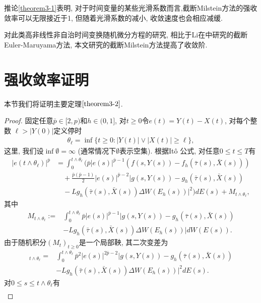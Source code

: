 \begin{remark}
    推论\ref{theorem3-1}表明, 对于时间变量的某些光滑系数而言,截断Milstein方法的强收敛率可以无限接近于1, 但随着光滑系数的减小, 收敛速度也会相应减缓.
\end{remark}
\begin{remark}
    对此类高非线性非自治时间变换随机微分方程的研究, 相比于Li在\cite{Li2023651}中研究的截断Euler-Maruyama方法, 本文研究的截断Milstein方法提高了收敛阶.
\end{remark}
\section{强收敛率证明}
本节我们将证明主要定理$\ref{theorem3-2}$.
\begin{proof}
固定任意$\bar{p}\in [2,p)$和$h\in(0,1]$, 对$t\geq 0$令$e(t)=Y(t)-X(t)$, 对每个整数 $\ell> |Y(0)|$定义停时
\begin{align}
    \theta_{\ell}=\inf\{t\geq0:|Y(t)|\vee|X(t)|\geq \ell\},
\end{align}
这里, 我们设$\inf\emptyset=\infty$ (通常情况下$\emptyset$表示空集). 根据It\^o 公式, 对任意$0\leq t\leq T$有
\begin{align}
    \label{error}
    |e(t\wedge \theta_{\ell})|^{\bar{p}}&=\int^{t\wedge\theta_{\ell}}_{0}\bigg(\bar{p}|e(s)|^{\bar{p}-1}\left(f(s,Y(s))-f_{h}(\bar{\tau}(s),\bar{X}(s))\right)\nonumber\\
    &\quad +\frac{\bar{p}(\bar{p}-1)}{2}|e(s)|^{\bar{p}-2}\big|g(s,Y(s))-g_{h}(\bar{\tau}(s),\bar{X}(s))\nonumber\\
    &\quad
    -Lg_{h}(\bar{\tau}(s),\bar{X}(s))\Delta W(E_h(s))\big|^2 \bigg)dE(s)+M_{t\wedge \theta_{\ell}},
\end{align}
其中
\begin{align*}
    M_{t\wedge \theta_{\ell}}:= &\int^{t\wedge\theta_{\ell}}_{0}\bar{p}|e(s)|^{\bar{p}-1}\big|g(s,Y(s))-g_{h}(\bar{\tau}(s),\bar{X}(s))\\
    &-Lg_{h}(\bar{\tau}(s),\bar{X}(s))\Delta W(E_h(s))\big|dW(E(s)).
\end{align*}
由于随机积分$(M_t)_{t\geq 0}$是一个局部鞅, 其二次变差为
\begin{align*}
    [M,M]_{t\wedge \theta_{\ell}}=&\int^{t\wedge\theta_{\ell}}_{0}\bar{p}^2|e(s)|^{2\bar{p}-2}\big|g(s,Y(s))-g_{h}(\bar{\tau}(s),\bar{X}(s))\\
    &-Lg_{h}(\bar{\tau}(s),\bar{X}(s))\Delta W(E_h(s))\big|^2 dE(s).
\end{align*}
对$0\leq s\leq t\wedge\theta_{\ell}$有
\begin{align*}

\end{align*}
\end{proof}
